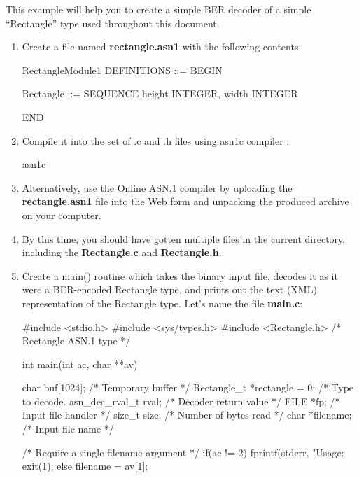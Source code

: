 \documentclass[english,oneside,12pt]{book}
\begin{document}
This example will help you to create a simple BER decoder of a simple
``Rectangle'' type used throughout this document.
\begin{enumerate}
\item Create a file named \textbf{rectangle.asn1} with the following contents:

\begin{asn}
RectangleModule1 DEFINITIONS ::= BEGIN

Rectangle ::= SEQUENCE {
    height  INTEGER,
    width   INTEGER
}

END
\end{asn}
\item Compile it into the set of .c and .h files using asn1c compiler \cite{ASN1C}:

\begin{bash}
asn1c %
\end{bash}
\item Alternatively, use the Online ASN.1 compiler \cite{AONL} by uploading
the \textbf{rectangle.asn1} file into the Web form and unpacking the
produced archive on your computer.
\item By this time, you should have gotten multiple files in the current
directory, including the \textbf{Rectangle.c} and \textbf{Rectangle.h}.
\item Create a main() routine which takes the binary input file, decodes
it as it were a BER-encoded Rectangle type, and prints out the text
(XML) representation of the Rectangle type. Let's name the file \textbf{main.c}:

\begin{codesample}[basicstyle=\scriptsize\listingfont]
#include <stdio.h>
#include <sys/types.h>
#include <Rectangle.h>   /* Rectangle ASN.1 type  */

int main(int ac, char **av) {
    char buf[1024];      /* Temporary buffer      */
    Rectangle_t *rectangle = 0; /* Type to decode. %
    asn_dec_rval_t rval; /* Decoder return value  */
    FILE *fp;            /* Input file handler    */
    size_t size;         /* Number of bytes read  */
    char *filename;      /* Input file name */

    /* Require a single filename argument */
    if(ac != 2) {
        fprintf(stderr, "Usage: %
        exit(1);
    } else {
        filename = av[1];
    }

}
\end{codesample}
\end{enumerate}
\end{document}
